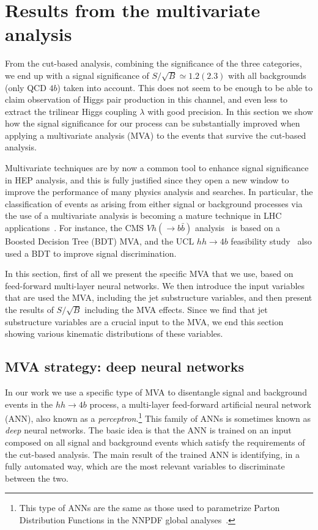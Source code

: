 
\section{Results from the multivariate analysis}
\label{sec:mva}

From the cut-based analysis,
combining the significance of the three categories,
we end up with a signal significance of $S/\sqrt{B}\simeq 1.2(2.3)$
with all backgrounds (only QCD $4b$) taken into account.
%
This does not seem
to be enough to be able to claim observation
of Higgs pair production
in this channel, and even less to extract the trilinear Higgs  coupling
$\lambda$ with good precision.
%
In this section we show how the signal significance for
our process can
be substantially improved when
applying a multivariate analysis (MVA) to the events
 that survive the cut-based
 analysis.

 
%
Multivariate techniques are by now a common tool to enhance signal
significance in HEP analysis, and this is fully justified
since they open a new window to improve the performance
of many physics analysis and searches.
%
In particular, the classification of events as arising from either signal or
background processes via the use of a multivariate analysis is becoming
a mature
technique in LHC
applications~\cite{Baldi:2014pta,Aaltonen:2012qt,
  Wardrope:2014kya,Chatrchyan:2013zna,Dall'Osso:2015aia}.
%
For instance, the CMS $Vh(\to b\bar{b})$ analysis~\cite{Chatrchyan:2013zna}
is based on a Boosted Decision Tree (BDT) MVA, and the UCL $hh\to 4b$
feasibility study~\cite{Wardrope:2014kya}
also used  a BDT to improve signal discrimination.

In this section, first of all we present the specific MVA that we use,
based on feed-forward multi-layer neural networks.
%
We then introduce the input variables that are
used the MVA, including the jet substructure
variables, and then present the results of $S/\sqrt{B}$ including
the MVA effects.
%
Since we find that jet substructure variables are a crucial input
to the MVA, we end this section showing various kinematic distributions
of these variables.



\subsection{MVA strategy: deep neural networks}


%
In our work we use a specific type of  MVA to
disentangle signal and background events in the $hh\to 4b$ process,
a multi-layer feed-forward artificial neural network (ANN),
also known as a {\it perceptron}.\footnote{This type of ANNs are the same
  as those used to parametrize Parton Distribution Functions
in the NNPDF global analyses~\cite{DelDebbio:2004qj,Ball:2008by,Ball:2011mu,Ball:2010de}.}
%
This family of ANNs is sometimes known as {\it deep} neural networks.
%
The basic idea is that the ANN is trained on an input composed on
all  signal and background
events which satisfy the requirements of the
cut-based analysis.
%
The main result of the trained ANN is identifying, in a fully automated way,
which are the most relevant variables to discriminate between the two.

